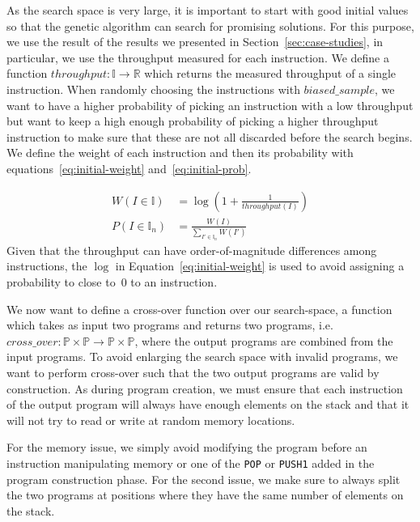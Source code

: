 As the search space is very large, it is important to start with good initial values so that the genetic algorithm can search for promising solutions. For this purpose, we use the result of the results we presented in Section~\ref{sec:case-studies}, in particular, we use the throughput measured for each instruction. We define a function $throughput : \mathbb{I} \rightarrow \mathbb{R}$ which returns the measured throughput of a single instruction. When randomly choosing the instructions with $biased\_sample$, we want to have a higher probability of picking an instruction with a low throughput but want to keep a high enough probability of picking a higher throughput instruction to make sure that these are not all discarded before the search begins. We define the weight of each instruction and then its probability with equations~\ref{eq:initial-weight} and~\ref{eq:initial-prob}.

\begin{align}
  \label{eq:initial-weight}
  W(I\in \mathbb{I}) &= \log\left(1 + \frac{1}{throughput(I)}\right)\\
  \label{eq:initial-prob}
  P(I\in \mathbb{I}_n) &= \frac{W(I)}{\sum_{I'\in \mathbb{I}_n}W(I')}
\end{align}
%
Given that the throughput can have order-of-magnitude differences among instructions, the $\log$ in Equation~\ref{eq:initial-weight} is used to avoid assigning a probability to close to~$0$ to an instruction.

We now want to define a cross-over function over our search-space, a function which takes as input two programs and returns two programs, i.e. $cross\_over : \mathbb{P} \times \mathbb{P} \rightarrow \mathbb{P} \times \mathbb{P}$, where the output programs are combined from the input programs. To avoid enlarging the search space with invalid programs, we want to perform cross-over such that the two output programs are valid by construction. As during program creation, we must ensure that each instruction of the output program will always have enough elements on the stack and that it will not try to read or write at random memory locations.

For the memory issue, we simply avoid modifying the program before an instruction manipulating memory or one of the \lstinline{POP} or \lstinline{PUSH1} added in the program construction phase. For the second issue, we make sure to always split the two programs at positions where they have the same number of elements on the stack.

